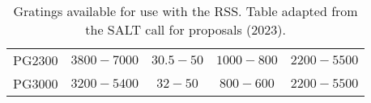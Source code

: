 \begin{table}[t]
\begin{tabular}{ccccc}
    PG2300                                & $3800 - 7000$                                                             & $30.5 - 50$                                                     & $1000 - 800$                                                            & $2200 - 5500$                                                                  \\
    PG3000                                & $3200 - 5400$                                                             & $32 - 50$                                                       & $800 - 600$                                                             & $2200 - 5500$                                                                  \\ \hline
  \end{tabular}
  \caption{Gratings available for use with the \gls{RSS}. Table adapted from the \gls{SALT} call for proposals (2023).}
  \label{table:RSS_gratings}
\end{table}
